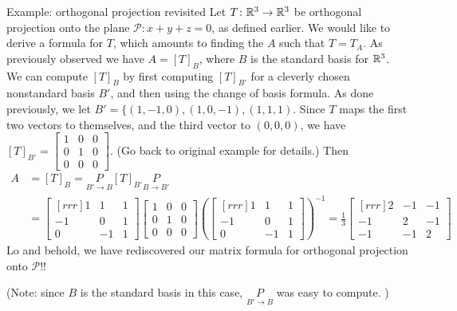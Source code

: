 \begin{frame}{Example: orthogonal projection revisited}
Let $T\colon {\mathbb R}^3\rightarrow{\mathbb R}^3$ be orthogonal projection onto the plane $\mathcal{P}: x+y+z=0$, as defined earlier. We would like to derive a formula for $T$, which amounts to finding the $A$ such that $T=T_A$. 
\bpause 
As previously observed we have $A=[T]_B$, where $B$ is the \alert{standard basis} for ${\mathbb R}^3$. We can compute $[T]_B$ by first computing $[T]_{B'}$ for a cleverly chosen \alert{nonstandard} basis $B'$, and then using the change of basis formula. 
\bpause 
As done previously, we let $B'=\{(1,-1,0), (1,0,-1), (1,1,1)$. Since $T$ maps the first two vectors to themselves, and the third vector to $(0,0,0)$, we have $[T]_{B'}=\begin{bmatrix}
1&0&0\\
0&1&0\\
0&0&0
\end{bmatrix}$. (Go back to original example for details.) 
\bpause 
Then 
\begin{align*}
A&=[T]_B=\underset{B'\rightarrow B}{P}[T]_{B'}\underset{B\rightarrow B'}{P}\\
&=\begin{bmatrix}[rrr]
1&1&1\\
-1&0&1\\
0&-1&1
\end{bmatrix}
\begin{bmatrix}
1&0&0\\
0&1&0\\
0&0&0
\end{bmatrix}
\left( \begin{bmatrix}[rrr]
1&1&1\\
-1&0&1\\
0&-1&1
\end{bmatrix}\right)^{-1}
=\frac{1}{3}\begin{bmatrix}[rrr]
2&-1&-1\\
-1&2&-1\\
-1&-1&2
\end{bmatrix}
\end{align*}
\pause
Lo and behold, we have rediscovered our matrix formula for orthogonal projection onto $\mathcal{P}$!! 

(Note: since $B$ is the standard basis in this case, $\underset{B'\rightarrow B}{P}$ was easy to compute. )
\end{frame}
